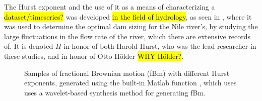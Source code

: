 The Hurst exponent and the use of it as a means of characterizing a \hl{dataset/timeseries?} was developed \hl{in the field of hydrology}, as seen in \cite{hurst1951longterm,hurst1965longterm}, where it was used to determine the optimal dam sizing for the Nile river's, by studying the large fluctuations in the flow rate of the river, which there are extensive records of. It is denoted $H$ in honor of both Harold Hurst, who was the lead researcher in these studies, and in honor of Otto H\"older \hl{WHY H\"older?}.
%
%
%
%
\begin{figure}[htpb]%
    \centering%
    {%
        \newcommand{\sa}{H $\approx$ }%
    }%
    \caption{%
        Samples of fractional Brownian motion (fBm) with different Hurst exponents, generated using the built-in Matlab function , which uses uses a wavelet-based synthesis method\cite{abry1996wavelet} for generating fBm.%
    }%
    \label{fig:fBm_examples}%
\end{figure}%
%
%
%
%
%
